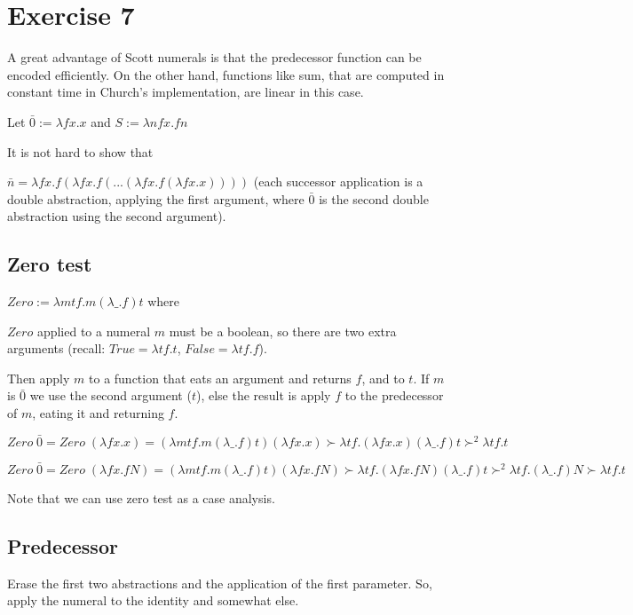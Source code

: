 
\section*{Exercise 7}

A great advantage of Scott numerals is that the predecessor function can be
encoded efficiently. On the other hand, functions like sum, that are computed
in constant time in Church's implementation, are linear in this case.

Let $ \bar{0} := \lambda f x . x $ and $ S := \lambda n f x . f n $

It is not hard to show that

$ \bar{n}
= \lambda f x . f (\lambda f x . f ( ...(\lambda f x . f (\lambda f x. x))))$
(each successor application is a double abstraction, applying the first
argument, where $\bar{0}$ is the second double abstraction using the second
argument).

\subsection*{Zero test}

$Zero := \lambda m t f . m (\lambda \_ . f) t$ where


$Zero$ applied to a numeral $m$ must be a boolean, so there are two extra
arguments (recall: $True = \lambda t f.t$, $False = \lambda t f . f$).

Then apply $m$ to a function that eats an argument and returns $f$, and to
$t$. If $m$ is $\bar{0}$ we use the second argument ($t$), else the result is
apply $f$ to the predecessor of $m$, eating it and returning $f$.

$$
Zero \; \bar{0} = Zero \; (\lambda f x . x) =
(\lambda m t f . m (\lambda \_ . f) t) (\lambda f x . x) \succ
\lambda t f . (\lambda f x . x) (\lambda \_ . f) t  \succ^{2} \lambda t f .t
$$

$$
Zero \; \bar{0} = Zero \; (\lambda f x . f N) =
(\lambda m t f . m (\lambda \_ . f) t) (\lambda f x . f N) \succ
\lambda t f . (\lambda f x . f N) (\lambda \_ . f) t
\succ^{2} \lambda t f . (\lambda \_ . f) N \succ \lambda t f . t
$$

Note that we can use zero test as a case analysis.


\subsection*{Predecessor}

Erase the first two abstractions and the application of the first
parameter. So, apply the numeral to the identity and somewhat else.

